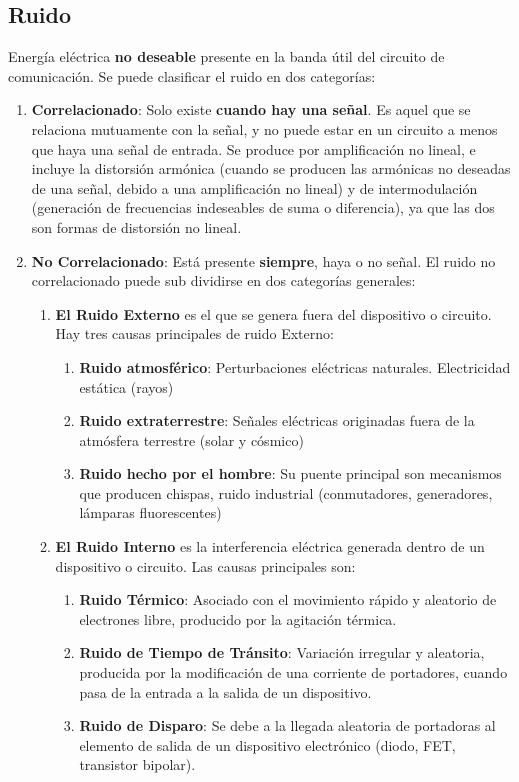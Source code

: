 \documentclass[
	12pt, %
	fleqn, %
	a4paper, %
	oneside, %
]{LegrandOrangeBook}
\begin{document}
\subsection{Ruido}
Energía eléctrica \textbf{no deseable} presente en la banda útil del circuito de comunicación. Se puede clasificar el ruido en dos categorías:
\begin{enumerate}
\item \textbf{Correlacionado}: Solo existe \textbf{cuando hay una señal}. Es aquel que se relaciona mutuamente con la señal, y no puede estar en un circuito a menos que haya una señal de entrada.
Se produce por amplificación no lineal, e incluye la distorsión armónica (cuando se producen las armónicas no deseadas de una señal, debido a una amplificación no lineal) y de intermodulación (generación de frecuencias indeseables de suma o diferencia), ya que las dos son formas de distorsión no lineal.
\item \textbf{No Correlacionado}: Está presente \textbf{siempre}, haya o no señal. El ruido no correlacionado puede sub dividirse en dos categorías generales:
\begin{enumerate}
\item \textbf{El Ruido Externo }es el que se genera fuera del dispositivo o circuito. Hay tres causas principales de ruido Externo:
\begin{enumerate}
\item \textbf{Ruido atmosférico}: Perturbaciones eléctricas naturales. Electricidad estática (rayos)
\item \textbf{Ruido extraterrestre}: Señales eléctricas originadas fuera de la atmósfera terrestre (solar y cósmico)
\item \textbf{Ruido hecho por el hombre}: Su puente principal son mecanismos que producen chispas, ruido industrial (conmutadores, generadores, lámparas fluorescentes)
\end{enumerate}
\item \textbf{El Ruido Interno} es la interferencia eléctrica generada dentro de un dispositivo o circuito. Las causas principales son:
\begin{enumerate}
\item \textbf{Ruido Térmico}: Asociado con el movimiento rápido y aleatorio de electrones libre, producido por la agitación térmica.
\item \textbf{Ruido de Tiempo de Tránsito}: Variación irregular y aleatoria, producida por la modificación de una corriente de portadores, cuando pasa de la entrada a la salida de un dispositivo.
\item \textbf{Ruido de Disparo}: Se debe a la llegada aleatoria de portadoras al elemento de salida de un dispositivo electrónico (diodo, FET, transistor bipolar).
\end{enumerate}
\end{enumerate}
\end{enumerate}
\end{document}
